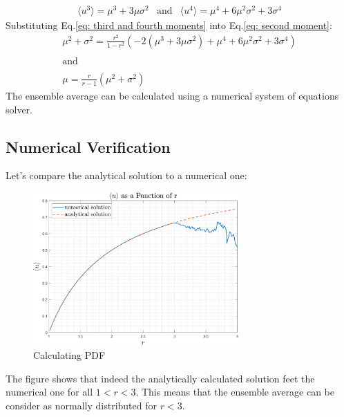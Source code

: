 \documentclass[11pt, a4paper]{article}
\begin{document}
\begin{equation}
    \begin{matrix}
        \langle u^3\rangle=\mu^3+3\mu\sigma^2 & \text{and} & \langle u^4\rangle=\mu^4+6\mu^2\sigma^2+3\sigma^4
    \end{matrix}
    \label{eq: third and fourth moments}
\end{equation}
Substituting Eq.\ref{eq: third and fourth moments} into Eq.\ref{eq: second moment}:
\begin{equation}
    \begin{array}{c}
        \mu^2+\sigma^2=\displaystyle\frac{r^2}{1-r^2}\left(-2\left(\mu^3+3\mu\sigma^2\right)+\mu^4+6\mu^2\sigma^2+3\sigma^4\right) \\\\
        \text{and} \\\\
        \mu=\displaystyle\frac{r}{r-1}\left(\mu^2+\sigma^2\right)
    \end{array}
\end{equation}
The ensemble average can be calculated using a numerical system of equations solver.
\subsection{Numerical Verification}
Let's compare the analytical solution to a numerical one:
\begin{figure}[H]
    \centering
    \includegraphics[width=0.7\textwidth]{images/Q2.4.png}
    \caption{Calculating PDF}
    \label{fig: calculating pdf}
\end{figure}
\noindent The figure shows that indeed the analytically calculated solution feet the numerical one for all $1<r<3$. This means that the ensemble average can be consider as normally distributed for $r<3$.
\end{document}
